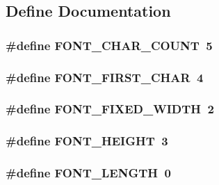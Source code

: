 \subsection{Define Documentation}
\hypertarget{g_text-1_8h_a4546cd12e3ae03bca0659ed77eeb872e}{
\subsubsection[{FONT\_\-CHAR\_\-COUNT}]{\setlength{\rightskip}{0pt plus 5cm}\#define FONT\_\-CHAR\_\-COUNT~5}}
\label{g_text-1_8h_a4546cd12e3ae03bca0659ed77eeb872e}
\hypertarget{g_text-1_8h_abf840ca631179d25994d5f1dc3594646}{
\subsubsection[{FONT\_\-FIRST\_\-CHAR}]{\setlength{\rightskip}{0pt plus 5cm}\#define FONT\_\-FIRST\_\-CHAR~4}}
\label{g_text-1_8h_abf840ca631179d25994d5f1dc3594646}
\hypertarget{g_text-1_8h_afc65866121cd2eba3caa85d2946eeec0}{
\subsubsection[{FONT\_\-FIXED\_\-WIDTH}]{\setlength{\rightskip}{0pt plus 5cm}\#define FONT\_\-FIXED\_\-WIDTH~2}}
\label{g_text-1_8h_afc65866121cd2eba3caa85d2946eeec0}
\hypertarget{g_text-1_8h_a33f4fac49f2a5e27e2857eb27f054510}{
\subsubsection[{FONT\_\-HEIGHT}]{\setlength{\rightskip}{0pt plus 5cm}\#define FONT\_\-HEIGHT~3}}
\label{g_text-1_8h_a33f4fac49f2a5e27e2857eb27f054510}
\hypertarget{g_text-1_8h_ae06dc7b9804bb102859f0e32754e79a5}{
\subsubsection[{FONT\_\-LENGTH}]{\setlength{\rightskip}{0pt plus 5cm}\#define FONT\_\-LENGTH~0}}
